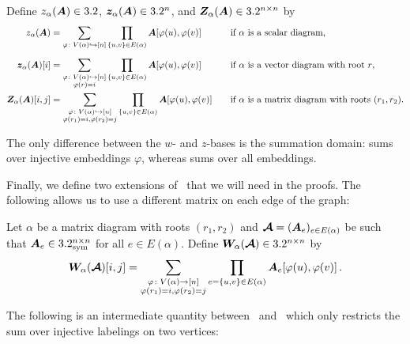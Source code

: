 \begin{definition}
    \label{def:z-basis}
    Define $z_\alpha({\bm A})
    \in 3.2$, ${\bm z}_\alpha({\bm A})\in 3.2^n$, and ${\bm Z}_\alpha({\bm A})\in 3.2^{n\times n}$ by
    \begin{alignat*}{2}
        z_\alpha({\bm A}) &= \sum_{\substack{\varphi\colon V(\alpha)\hookrightarrow [n]}} \prod_{\{u,v\}\in E(\alpha)} {\bm A}[\varphi(u),\varphi(v)] &&\text{if $\alpha$ is a scalar diagram,}\\[2mm]
        {\bm z}_\alpha({\bm A})[i] &= \sum_{\substack{\varphi\colon V(\alpha)\hookrightarrow [n]\\\varphi(r) = i}} \prod_{\{u,v\}\in E(\alpha)} {\bm A}[\varphi(u),\varphi(v)] && \text{if $\alpha$ is a vector diagram with root $r$,}\\
        {\bm Z}_\alpha({\bm A})[i,j] &= \sum_{\substack{\varphi\colon V(\alpha)\hookrightarrow [n]\\\varphi(r_1)=i,\varphi(r_2)=j}} \prod_{\{u,v\}\in E(\alpha)} {\bm A}[\varphi(u),\varphi(v)] \quad&& \text{if $\alpha$ is a matrix diagram with roots $(r_1,r_2)$.}
    \end{alignat*}    
\end{definition}

\noindent The only difference between the $w$- and $z$-bases
is the summation domain:  sums over injective embeddings $\varphi$, whereas  sums over all
embeddings.

Finally, we define two extensions of~
that we will need in the proofs.
The following allows us to use a different matrix on
each edge of the graph:

\begin{definition}
    \label{def:non-uniform-label}
    Let $\alpha$ be a matrix diagram with roots $(r_1,r_2)$ and $\bm {{\cal A}} = ({\bm A}_e)_{e\in E(\alpha)}$ be
    such that ${\bm A}_e\in 3.2_{\mathrm{sym}}^{n\times n}$ for
    all $e\in E(\alpha)$. Define ${\bm W}_\alpha(\bm {{\cal A}})\in 3.2^{n\times n}$ by
    \[
        {\bm W}_\alpha(\bm {{\cal A}})[i,j] = \sum_{\substack{\varphi\colon V(\alpha)\to [n]\\\varphi(r_1)=i,\varphi(r_2)=j}} \prod_{e=\{u,v\}\in E(\alpha)} {\bm A}_e[\varphi(u),\varphi(v)]\,.
    \]
\end{definition}

The following is an intermediate quantity
between~ and~ which only restricts the sum
over injective labelings on two vertices:

